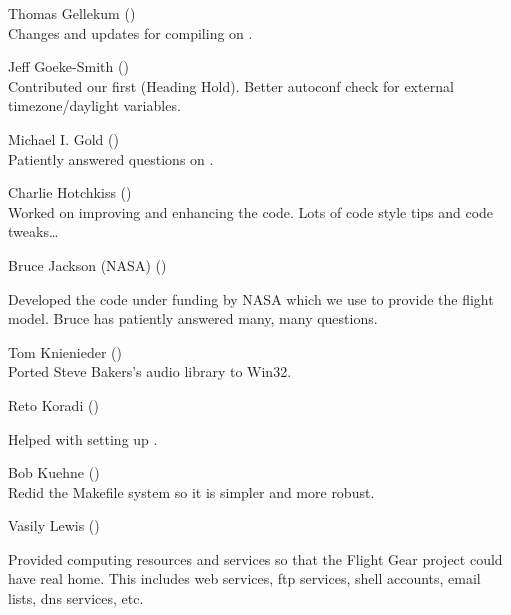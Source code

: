 \noindent Thomas Gellekum ()\\
  Changes and updates for compiling on .
 \medskip

\noindent Jeff Goeke-Smith ()\\
  Contributed our first  (Heading Hold).
  Better autoconf check for external timezone/daylight variables.
 \medskip

\noindent Michael I. Gold ()\\
 Patiently answered questions on .
 \medskip

\noindent Charlie Hotchkiss
()\\ Worked on improving and enhancing the
 code.  Lots of code style tips and code tweaks\ldots
 \medskip

\noindent Bruce Jackson (NASA) ()


 \noindent
   Developed the  code under funding by NASA which we use to provide the
   flight model. Bruce has patiently answered many, many questions.
 \medskip

\noindent Tom Knienieder ()\\
  Ported Steve Bakers's audio library to Win32.
 \medskip

\noindent Reto Koradi ()

\href{\web{http://www.mol.biol.ethz.ch/~kor}}{}

\noindent
  Helped with setting up .
 \medskip

\noindent Bob Kuehne ()\\
  Redid the Makefile system so it is simpler and more robust.
 \medskip

\noindent Vasily Lewis ()


 \noindent
  Provided computing resources and services so that the Flight Gear
  project could have real home.  This includes web services, ftp
  services, shell accounts, email lists, dns services, etc.
 \medskip


